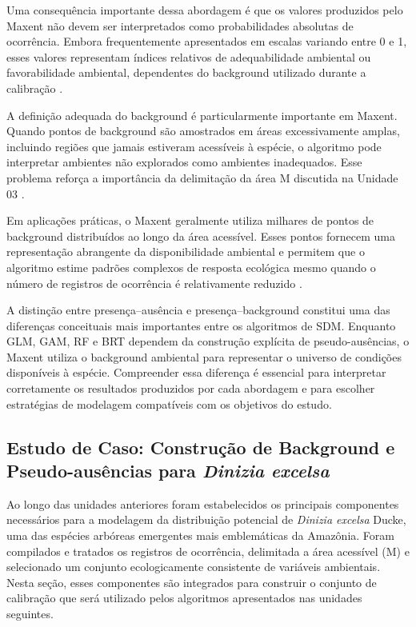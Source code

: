 Uma consequência importante dessa abordagem é que os valores produzidos pelo Maxent não devem ser interpretados como probabilidades absolutas de ocorrência. Embora frequentemente apresentados em escalas variando entre 0 e 1, esses valores representam índices relativos de adequabilidade ambiental ou favorabilidade ambiental, dependentes do background utilizado durante a calibração \citep{merow2013practical}.

A definição adequada do background é particularmente importante em Maxent. Quando pontos de background são amostrados em áreas excessivamente amplas, incluindo regiões que jamais estiveram acessíveis à espécie, o algoritmo pode interpretar ambientes não explorados como ambientes inadequados. Esse problema reforça a importância da delimitação da área M discutida na Unidade 03 \citep{barve2011crucial}.

Em aplicações práticas, o Maxent geralmente utiliza milhares de pontos de background distribuídos ao longo da área acessível. Esses pontos fornecem uma representação abrangente da disponibilidade ambiental e permitem que o algoritmo estime padrões complexos de resposta ecológica mesmo quando o número de registros de ocorrência é relativamente reduzido \citep{phillips2006maximum}.

A distinção entre presença--ausência e presença--background constitui uma das diferenças conceituais mais importantes entre os algoritmos de SDM. Enquanto GLM, GAM, RF e BRT dependem da construção explícita de pseudo-ausências, o Maxent utiliza o background ambiental para representar o universo de condições disponíveis à espécie. Compreender essa diferença é essencial para interpretar corretamente os resultados produzidos por cada abordagem e para escolher estratégias de modelagem compatíveis com os objetivos do estudo.

\subsection{Estudo de Caso: Construção de Background e Pseudo-ausências para \textit{Dinizia excelsa}}

Ao longo das unidades anteriores foram estabelecidos os principais componentes necessários para a modelagem da distribuição potencial de \textit{Dinizia excelsa} Ducke, uma das espécies arbóreas emergentes mais emblemáticas da Amazônia. Foram compilados e tratados os registros de ocorrência, delimitada a área acessível (M) e selecionado um conjunto ecologicamente consistente de variáveis ambientais. Nesta seção, esses componentes são integrados para construir o conjunto de calibração que será utilizado pelos algoritmos apresentados nas unidades seguintes.

